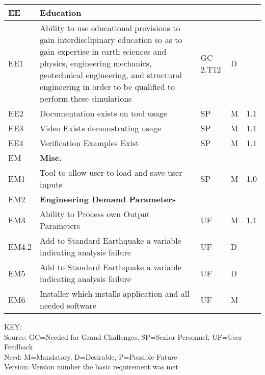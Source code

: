 \begin{longtable}{| p{} | p{} | p{} | p{} |  p{} |}
    EE & \textbf{Education} &  &  & \\ \hline
    EE1 & Ability to use educational provisions to gain interdisclipinary education so as to gain expertise in earth sciences and physics, engineering mechanics, geotechnical engineering, and structural engineering in order to be qualified to perform these simulations & GC 2.T12 & D & \\ \hline
    EE2 & Documentation exists on tool usage & SP & M & 1.1  \\ \hline
    EE3 & Video Exists demonstrating usage & SP & M & 1.1  \\ \hline
    EE4 & Verification Examples Exist & SP & M & 1.1  \\ \hhline{=====}
    EM & \textbf{Misc.} &  &  \\ \hline
    EM1 & Tool to allow user to load and save user inputs & SP & M & 1.0 \\ \hline
    EM2 & \textbf{Engineering Demand Parameters} &  &  \\ \hline
    EM3 & Ability to Process own Output Parameters & UF & M & 1.1  \\ \hline
    EM4.2 & Add to Standard Earthquake a variable indicating analysis failure & UF & D &   \\ \hline
    EM5 & Add to Standard Earthquake a variable indicating analysis failure & UF & D &   \\ \hline
    EM6 & Installer which installs application and all needed software & UF & M &   \\ \hline
      
  \bottomrule 
               
\end{longtable}

\noindent
KEY:\\
Source: GC=Needed for Grand Challenges, SP=Senior Personnel, UF=User Feedback \\
Need: M=Mandatory, D=Desirable, P=Possible Future \\
Version: Version number the basic requirement was met 
